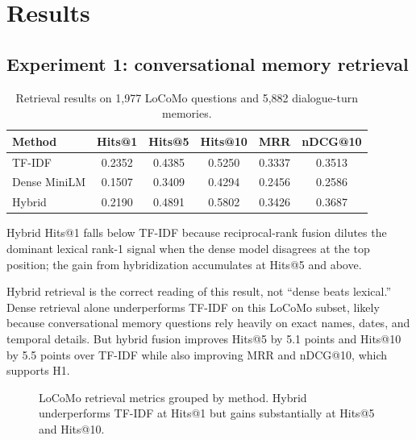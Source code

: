 \documentclass[11pt]{article}
\begin{document}
\section{Results}
\subsection{Experiment 1: conversational memory retrieval}
\begin{table}[t]
    \centering
    \caption{Retrieval results on 1,977 LoCoMo questions and 5,882 dialogue-turn memories.}
    \begin{tabular}{lccccc}
        \toprule
        Method & Hits@1 & Hits@5 & Hits@10 & MRR & nDCG@10 \\
        \midrule
        TF-IDF & 0.2352 & 0.4385 & 0.5250 & 0.3337 & 0.3513 \\
        Dense MiniLM & 0.1507 & 0.3409 & 0.4294 & 0.2456 & 0.2586 \\
        Hybrid & 0.2190 & 0.4891 & 0.5802 & 0.3426 & 0.3687 \\
        \bottomrule
    \end{tabular}
    \label{tab:retrieval}
\end{table}

\noindent Hybrid Hits@1 falls below TF-IDF because reciprocal-rank fusion dilutes the dominant lexical rank-1 signal when the dense model disagrees at the top position; the gain from hybridization accumulates at Hits@5 and above.

Hybrid retrieval is the correct reading of this result, not ``dense beats lexical.'' Dense retrieval alone underperforms TF-IDF on this LoCoMo subset, likely because conversational memory questions rely heavily on exact names, dates, and temporal details. But hybrid fusion improves Hits@5 by 5.1 points and Hits@10 by 5.5 points over TF-IDF while also improving MRR and nDCG@10, which supports H1.

\begin{figure}[t]
\centering
{}
\caption{LoCoMo retrieval metrics grouped by method. Hybrid underperforms TF-IDF at Hits@1 but gains substantially at Hits@5 and Hits@10.}
\label{fig:retrieval-bars}
\end{figure}
\end{document}
